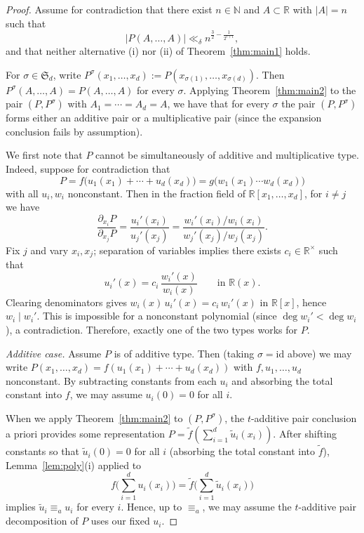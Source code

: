 \documentclass[10pt,a4paper]{amsart}
\begin{document}
\begin{proof}
Assume for contradiction that there exist $n\in\mathbb N$ and $A\subset\mathbb R$ with $|A|=n$ such that
$$|P(A,\ldots,A)|\ll_{\delta} n^{\frac32-\frac1{2^{t+1}}},$$
and that neither alternative (i) nor (ii) of Theorem~\ref{thm:main1} holds.

For $\sigma\in\mathfrak S_d$, write
$P^{\sigma}(x_1,\ldots,x_d):=P(x_{\sigma(1)},\ldots,x_{\sigma(d)})$.
Then $P^{\sigma}(A,\ldots,A)=P(A,\ldots,A)$ for every $\sigma$.
Applying Theorem~\ref{thm:main2} to the pair $(P,P^{\sigma})$ with $A_1=\cdots=A_d=A$, we have that for every $\sigma$
the pair $(P,P^{\sigma})$ forms either an additive pair or a multiplicative pair (since the expansion conclusion fails by assumption).

We first note that $P$ cannot be simultaneously of additive and multiplicative type.
Indeed, suppose for contradiction that
\[
P=f\big(u_1(x_1)+\cdots+u_d(x_d)\big)=g\big(w_1(x_1)\cdots w_d(x_d)\big)
\]
with all $u_i,w_i$ nonconstant.
Then in the fraction field of $\mathbb R[x_1,\ldots,x_d]$, for $i\neq j$ we have
\[
\frac{\partial_{x_i}P}{\partial_{x_j}P}
=\frac{u_i'(x_i)}{u_j'(x_j)}
=\frac{w_i'(x_i)/w_i(x_i)}{w_j'(x_j)/w_j(x_j)}.
\]
Fix $j$ and vary $x_i,x_j$; separation of variables implies there exists $c_i\in\mathbb R^\times$ such that
\[
u_i'(x)=c_i\,\frac{w_i'(x)}{w_i(x)}\qquad\text{in }\mathbb R(x).
\]
Clearing denominators gives $w_i(x)\,u_i'(x)=c_i\,w_i'(x)$ in $\mathbb R[x]$, hence $w_i\mid w_i'$.
This is impossible for a nonconstant polynomial (since $\deg w_i'<\deg w_i$), a contradiction.
Therefore, exactly one of the two types works for $P$.

\smallskip
\noindent\emph{Additive case.}
Assume $P$ is of additive type. Then (taking $\sigma=\mathrm{id}$ above) we may write
$P(x_1,\ldots,x_d)=f(u_1(x_1)+\cdots+u_d(x_d))$
with $f,u_1,\ldots,u_d$ nonconstant.
By subtracting constants from each $u_i$ and absorbing the total constant into $f$,
we may assume $u_i(0)=0$ for all $i$.


When we apply Theorem~\ref{thm:main2} to $(P,P^\sigma)$, the $t$-additive pair conclusion a priori provides
some representation $P=\widetilde f(\sum_{i=1}^d \widetilde u_i(x_i))$.
After shifting constants so that $\widetilde u_i(0)=0$ for all $i$ (absorbing the total constant into $\widetilde f$),
Lemma~\ref{lem:poly}(i) applied to
\[
f\Big(\sum_{i=1}^d u_i(x_i)\Big)=\widetilde f\Big(\sum_{i=1}^d \widetilde u_i(x_i)\Big)
\]
implies $\widetilde u_i\equiv_a u_i$ for every $i$.
Hence, up to $\equiv_a$, we may assume the $t$-additive pair decomposition of $P$ uses our fixed $u_i$.





\end{proof}
\end{document}
